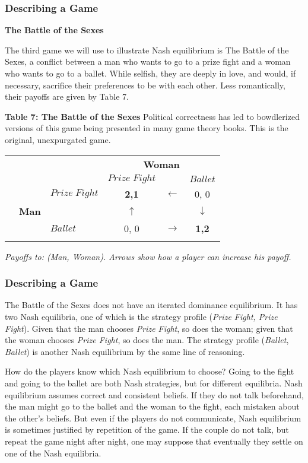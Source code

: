  \begin{frame}[fragile]\frametitle{Describing a Game}
 {\bf  The Battle of the Sexes   }

  The third game we will use to illustrate Nash equilibrium is The {
Battle of the Sexes}, a conflict between a man who wants to go to a prize fight
and a woman who wants to go to a ballet.  While selfish, they are deeply in
love, and would, if necessary, sacrifice their preferences to be with each
other. Less romantically, their payoffs are given by Table  7.

\begin{center} {\bf Table  7:  The Battle of the Sexes   }{Political
correctness has led to   bowdlerized versions of this game being presented in
many game theory books. This is the original, unexpurgated game.   }

 \begin{tabular}{lllccc}
 &       &             &\multicolumn{3}{c}{\bf Woman}\\ &       &             &
$Prize \; Fight$  & & $Ballet$  \\ &   &  $Prize \; Fight$   &  {\bf 2,1} &
$\leftarrow$  & $0$, 0 \\ & {\bf Man} &     & $\uparrow$  & & $\downarrow$ \\
 &  &       $Ballet$     &      $0$, $0$ & $\rightarrow$  & {\bf 1,2} \\ & & &
&\\
 \end{tabular}
 \end{center}

 {\it Payoffs  to: (Man, Woman). Arrows show how a player can increase his
payoff.    }
\end{frame}
 \begin{frame}[fragile]\frametitle{Describing a Game}

    {  The  Battle of the Sexes}   does not have an iterated dominance
equilibrium. It has two Nash equilibria, one of which is the strategy profile
({\it Prize Fight, Prize Fight}).  Given that the man chooses {\it Prize Fight},
so does the woman; given that the woman chooses {\it Prize Fight}, so does the
man.  The strategy profile ({\it Ballet}, {\it Ballet}) is another Nash
equilibrium by the same line of reasoning.

   How do the players know which Nash equilibrium to choose? Going to the fight
and going to the ballet are both Nash strategies, but for different equilibria.
Nash equilibrium assumes correct and consistent beliefs.  If they do not talk
beforehand, the man might go to the ballet and the woman to the fight, each
mistaken about the other's beliefs.  But even if the players do not communicate,
Nash equilibrium is sometimes justified by repetition of the game. If the couple
do not talk, but repeat the game night after night, one may suppose that
eventually they settle on one of the Nash equilibria.

\end{frame}
